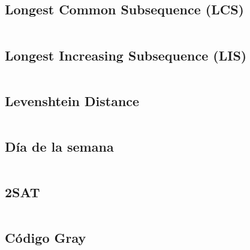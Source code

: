 \documentclass[11pt]{article}
\begin{document}
		\subsection{Longest Common Subsequence (LCS)}
		\inputminted[tabsize=2,breaklines,firstline=21,lastline=33,fontsize=\small]{c++}{misc.cpp}
		
		\subsection{Longest Increasing Subsequence (LIS)}
		\inputminted[tabsize=2,breaklines,firstline=5,lastline=19,fontsize=\small]{c++}{misc.cpp}
		
		\subsection{Levenshtein Distance}
		\inputminted[tabsize=2,breaklines,firstline=145,lastline=156,fontsize=\small]{c++}{misc.cpp}
		
		\subsection{Día de la semana}
		\inputminted[tabsize=2,breaklines,firstline=35,lastline=44,fontsize=\small]{c++}{misc.cpp}
		
		\subsection{2SAT}
		\inputminted[tabsize=2,breaklines,firstline=85,lastline=128,fontsize=\small]{c++}{misc.cpp}
		
		\subsection{Código Gray}
		\inputminted[tabsize=2,breaklines,firstline=130,lastline=143,fontsize=\small]{c++}{misc.cpp}
\end{document}
